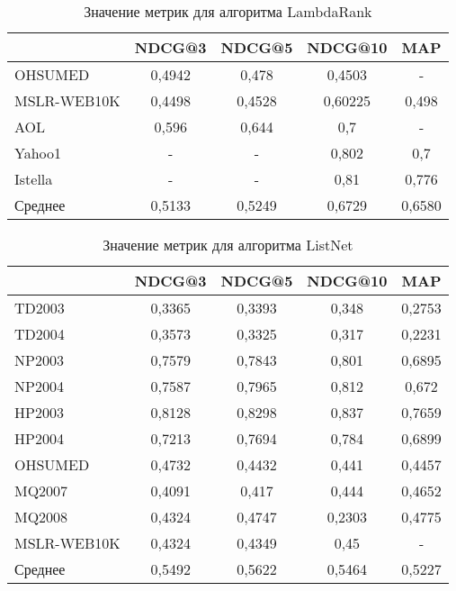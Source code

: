 \begin{table}[!ht]
	\begin{center}
		\begin{threeparttable}
			\captionsetup{justification=raggedright,singlelinecheck=off}
			\caption{Значение метрик для алгоритма LambdaRank}
			\label{tbl:LambdaRankM}
			\begin{tabular}{|l|c|c|c|c|}
				\hline
				\makecell[c]{Датасет} & NDCG@3 & NDCG@5 & NDCG@10 & MAP \\\hline
				OHSUMED	&0,4942&	0,478&	0,4503&	-\\\hline
				MSLR-WEB10K&0,4498&	0,4528&	0,60225&	0,498\\\hline
				AOL&0,596&	0,644&	0,7&	-\\\hline
				Yahoo1&	-&	-&	0,802&	0,7\\\hline
				Istella&-&	-&	0,81&	0,776\\\hline
				Среднее& 0,5133	&0,5249	&0,6729	&0,6580\\\hline
			\end{tabular}
		\end{threeparttable}
	\end{center}
\end{table}

\begin{table}[!ht]
	\begin{center}
		\begin{threeparttable}
			\captionsetup{justification=raggedright,singlelinecheck=off}
			\caption{Значение метрик для алгоритма ListNet}
			\label{tbl:ListNetM}
			\begin{tabular}{|l|c|c|c|c|}
				\hline
				\makecell[c]{Датасет}  & NDCG@3 & NDCG@5 & NDCG@10 & MAP \\\hline
				TD2003&	0,3365&	0,3393&	0,348&	0,2753\\\hline
				TD2004&	0,3573&	0,3325&	0,317&	0,2231\\\hline
				NP2003&	0,7579&	0,7843&	0,801&	0,6895\\\hline
				NP2004&	0,7587&	0,7965&	0,812&	0,672\\\hline
				HP2003&	0,8128&	0,8298&	0,837&	0,7659\\\hline
				HP2004&	0,7213&	0,7694&	0,784&	0,6899\\\hline
				OHSUMED&0,4732&	0,4432&	0,441&	0,4457\\\hline
				MQ2007&	0,4091&	0,417&	0,444&	0,4652\\\hline
				MQ2008&	0,4324&	0,4747&	0,2303&	0,4775\\\hline
				MSLR-WEB10K&0,4324&	0,4349&	0,45&	-\\\hline
				Среднее& 0,5492	&0,5622	&0,5464	&0,5227\\\hline
			\end{tabular}
		\end{threeparttable}
	\end{center}
\end{table}

